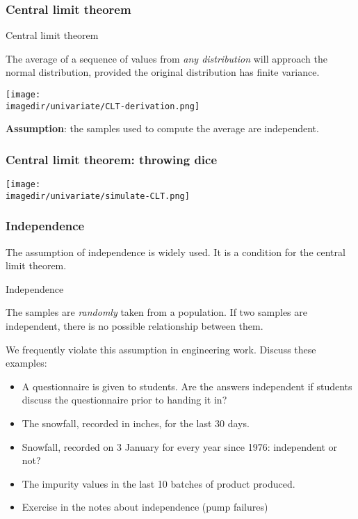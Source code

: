 \begin{frame}\frametitle{Central limit theorem}
	\begin{block}
		{Central limit theorem}
		\begin{center}
			The average of a sequence of values from \emph{any distribution} will approach the normal distribution, provided the original distribution has finite variance.
		\end{center}
	\end{block}

	\texttt{[image: \\imagedir/univariate/CLT-derivation.png]}

	\textbf{Assumption}: the samples used to compute the average are independent.
\end{frame}

\begin{frame}\frametitle{Central limit theorem: throwing dice}

	\texttt{[image: \\imagedir/univariate/simulate-CLT.png]}
\end{frame}

\begin{frame}\frametitle{Independence}

	The assumption of independence is widely used. It is a condition for the central limit theorem.
	\begin{block}
		{Independence}
		\begin{center}
			The samples are \emph{randomly} taken from a population. If two samples are independent, there is no possible relationship between them.
		\end{center}
	\end{block}

	We frequently violate this assumption in engineering work. Discuss these examples:
	\begin{itemize}
		\item A questionnaire is given to students. Are the answers independent if students discuss the questionnaire prior to handing it in?
		\item The snowfall, recorded in inches, for the last 30 days.
		\item Snowfall, recorded on 3 January for every year since 1976: independent or not?
		\item The impurity values in the last 10 batches of product produced.
		\item Exercise in the notes about independence (pump failures)
	\end{itemize}
\end{frame}


